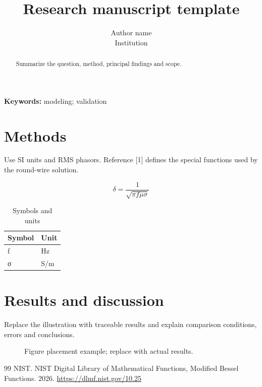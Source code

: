 \documentclass[11pt,a4paper]{article}
\begin{document}
\title{Research manuscript template}
\author{Author name\\Institution}
\date{}
\maketitle
\begin{abstract}
Summarize the question, method, principal findings and scope.
\end{abstract}
\noindent\textbf{Keywords: }modeling; validation\par
\section{Methods}
\hypertarget{chapter-01}{}
Use SI units and RMS phasors. Reference [1] defines the special functions used by the round-wire solution.

\begin{equation}\delta=\frac{1}{\sqrt{\pi f\mu\sigma}}\label{eq:skin}\end{equation}
\begin{table}[!htbp]
\centering
\caption{Symbols and units}
\begingroup\footnotesize
\begin{tabularx}{\textwidth}{>{\raggedright\arraybackslash}X>{\raggedright\arraybackslash}X}
\toprule
Symbol & Unit\\
\midrule
f & Hz\\
σ & S/m\\
\bottomrule
\end{tabularx}\endgroup
\end{table}
\section{Results and discussion}
\hypertarget{chapter-02}{}
Replace the illustration with traceable results and explain comparison conditions, errors and conclusions.

\renewcommand{\refname}{References}
\begin{figure}[!htbp]\centering\fbox{\rule{0pt}{22mm}\rule{.8\linewidth}{0pt}}\caption{Figure placement example; replace with actual results.}\label{fig:example}\end{figure}
\begin{thebibliography}{99}
 NIST. NIST Digital Library of Mathematical Functions, Modified Bessel Functions. 2026. \url{https://dlmf.nist.gov/10.25}
\end{thebibliography}
\end{document}
